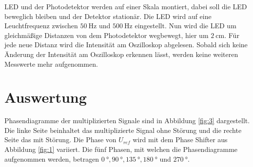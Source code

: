 \justifying LED  und der Photodetektor werden auf einer Skala montiert, dabei soll die LED beweglich bleiben und der Detektor stationär.
Die LED wird auf eine Leuchtfrequenz zwischen $\SI{50}{\hertz}$ und $\SI{500}{\hertz}$ eingestellt. Nun wird die LED um gleichmäßige Distanzen
von dem Photodetektor wegbewegt, hier um $\SI{2}{\centi\meter}$. Für jede neue Distanz wird die Intensität am Oszilloskop abgelesen. Sobald sich keine
Änderung der Intensität am Oszilloskop erkennen lässt, werden keine weiteren Messwerte mehr aufgenommen.  


\section{Auswertung} \label{sec:5}

\justifying Phasendiagramme der multiplizierten Signale sind in Abbildung \ref{fig:3} dargestellt. Die linke Seite beinhaltet
das multiplizierte Signal ohne Störung und die rechte Seite das mit Störung. Die Phase von $U_{ref}$ wird mit dem Phase Shifter aus Abbildung 
\ref{fig:1} variiert. Die fünf Phasen, mit welchen die Phasendiagramme aufgenommen werden, betragen $\SI{0}{\degree}, \SI{90}{\degree}, 
\SI{135}{\degree}, \SI{180}{\degree}$ und $\SI{270}{\degree}$.

